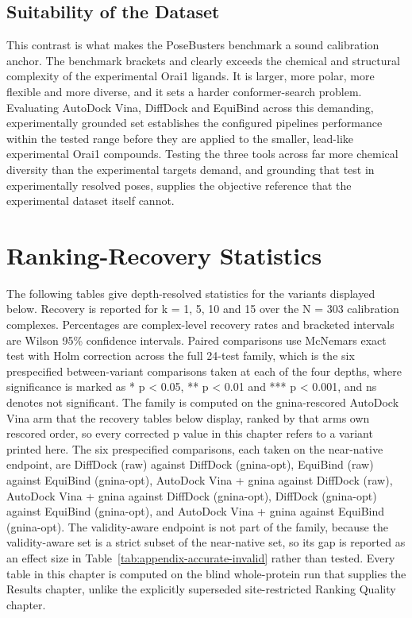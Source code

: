 \hypertarget{suitability-of-the-dataset}{%
\section{Suitability of the Dataset}\label{suitability-of-the-dataset}}

This contrast is what makes the PoseBusters benchmark a sound calibration anchor. The benchmark brackets and clearly exceeds the chemical and structural complexity of the experimental Orai1 ligands. It is larger, more polar, more flexible and more diverse, and it sets a harder conformer-search problem. Evaluating AutoDock Vina, DiffDock and EquiBind across this demanding, experimentally grounded set establishes the configured pipelines\textquotesingle{} performance within the tested range before they are applied to the smaller, lead-like experimental Orai1 compounds. Testing the three tools across far more chemical diversity than the experimental targets demand, and grounding that test in experimentally resolved poses, supplies the objective reference that the experimental dataset itself cannot.

\hypertarget{ranking-recovery-statistics}{%
\chapter{Ranking-Recovery Statistics}\label{ranking-recovery-statistics}}

The following tables give depth-resolved statistics for the variants displayed below. Recovery is reported for k = 1, 5, 10 and 15 over the N = 303 calibration complexes. Percentages are complex-level recovery rates and bracketed intervals are Wilson 95\% confidence intervals. Paired comparisons use McNemar\textquotesingle s exact test with Holm correction across the full 24-test family, which is the six prespecified between-variant comparisons taken at each of the four depths, where significance is marked as * p \textless{} 0.05, ** p \textless{} 0.01 and *** p \textless{} 0.001, and ns denotes not significant. The family is computed on the gnina-rescored AutoDock Vina arm that the recovery tables below display, ranked by that arm\textquotesingle s own rescored order, so every corrected p value in this chapter refers to a variant printed here. The six prespecified comparisons, each taken on the near-native endpoint, are DiffDock (raw) against DiffDock (gnina-opt), EquiBind (raw) against EquiBind (gnina-opt), AutoDock Vina + gnina against DiffDock (raw), AutoDock Vina + gnina against DiffDock (gnina-opt), DiffDock (gnina-opt) against EquiBind (gnina-opt), and AutoDock Vina + gnina against EquiBind (gnina-opt). The validity-aware endpoint is not part of the family, because the validity-aware set is a strict subset of the near-native set, so its gap is reported as an effect size in Table~\ref{tab:appendix-accurate-invalid} rather than tested. Every table in this chapter is computed on the blind whole-protein run that supplies the Results chapter, unlike the explicitly superseded site-restricted Ranking Quality chapter.

